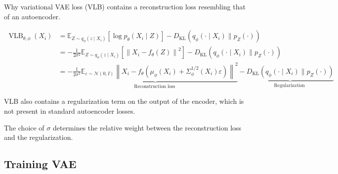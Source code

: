 \begin{frame}[allowframebreaks]

\begin{myconceptblock}{11.20}{Why variational}
    VAE loss (VLB) contains a reconstruction loss resembling that of an autoencoder.

    $$
    \begin{aligned}
    \operatorname{VLB}_{\theta, \phi}\left(X_{i}\right) & =\mathbb{E}_{Z \sim q_{\phi}\left(z \mid X_{i}\right)}\left[\log p_{\theta}\left(X_{i} \mid Z\right)\right]-D_{\mathrm{KL}}\left(q_{\phi}\left(\cdot \mid X_{i}\right) \| p_{Z}(\cdot)\right) \\
    & =-\frac{1}{2 \sigma^{2}} \mathbb{E}_{Z \sim q_{\phi}\left(z \mid X_{i}\right)}\left[\left\|X_{i}-f_{\theta}(Z)\right\|^{2}\right]-D_{\mathrm{KL}}\left(q_{\phi}\left(\cdot \mid X_{i}\right) \| p_{Z}(\cdot)\right) \\
    & =-\underbrace{\frac{1}{2 \sigma^{2}} \mathbb{E}_{\varepsilon \sim \mathcal{N}(0, I)}\left\|X_{i}-f_{\theta}\left(\mu_{\phi}\left(X_{i}\right)+\Sigma_{\phi}^{1 / 2}\left(X_{i}\right) \varepsilon\right)\right\|^{2}}_{\text {Reconstruction loss }}-\underbrace{D_{\mathrm{KL}}\left(q_{\phi}\left(\cdot \mid X_{i}\right) \| p_{Z}(\cdot)\right)}_{\text {Regularization }}
    \end{aligned}
    $$

    VLB also contains a regularization term on the output of the encoder, which is not present in standard autoencoder losses.

    The choice of $\sigma$ determines the relative weight between the reconstruction loss and the regularization.
\end{myconceptblock}

\end{frame}

\subsection{Training VAE}

